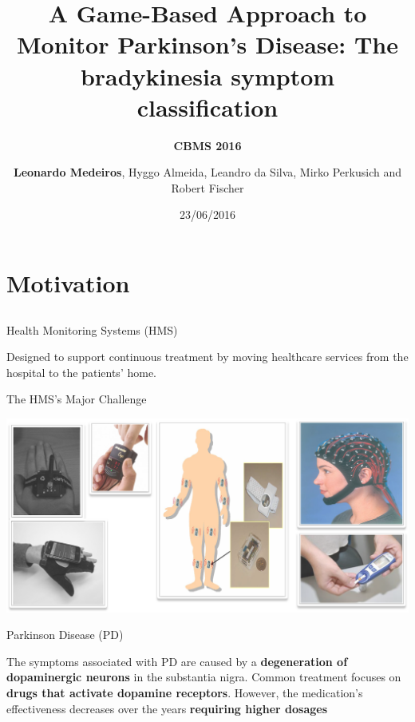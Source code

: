 \documentclass{beamer}
\author[]{\textbf{Leonardo Medeiros}, Hyggo Almeida, Leandro da Silva, Mirko Perkusich and Robert Fischer}
\date{23/06/2016}
\institute[]{Federal University Of Campina Grande - BRAZIL
}
\title{A Game-Based Approach to Monitor Parkinson's Disease: The bradykinesia symptom classification}
\subtitle{\textbf{CBMS 2016}}
\begin{document}
\begin{frame}
  \titlepage
\end{frame}

{
}






\section{Motivation}
\subsection{}
\begin{frame}{Health Monitoring Systems (HMS)}
  \begin{block}{}
Designed to support continuous treatment by moving healthcare services from the hospital to the patients' home. 
  \end{block} 
\end{frame}

\begin{frame}{The HMS's Major Challenge}
  \begin{block}{}
  \center
      \includegraphics[height=1.8 in]{img/sismonsaude.png}
  \end{block}  
\end{frame}


\begin{frame}{Parkinson Disease (PD)}  
  \begin{block}{}
The symptoms associated with PD are caused by a \textbf{degeneration of dopaminergic neurons} in the substantia nigra. Common treatment focuses on \textbf{drugs that activate dopamine receptors}. However, the medication's effectiveness decreases over the years \textbf{requiring higher dosages}
  \end{block} 
\end{frame}
\end{document}
